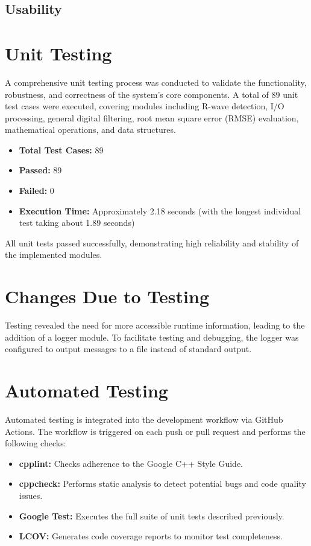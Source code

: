 \documentclass[12pt, titlepage]{article}
\begin{document}
\subsection{Usability}

\section{Unit Testing}

A comprehensive unit testing process was conducted to validate the
functionality, robustness, and correctness of the system's core components. A
total of 89 unit test cases were executed, covering modules including R-wave
detection, I/O processing, general digital filtering, root mean square error
(RMSE) evaluation, mathematical operations, and data structures.

\begin{itemize}
    \item \textbf{Total Test Cases:} 89
    \item \textbf{Passed:} 89
    \item \textbf{Failed:} 0
    \item \textbf{Execution Time:} Approximately 2.18 seconds (with the longest
    individual test taking about 1.89 seconds)
\end{itemize}

All unit tests passed successfully, demonstrating high reliability and stability
of the implemented modules.

\section{Changes Due to Testing}

Testing revealed the need for more accessible runtime information, leading to
the addition of a logger module. To facilitate testing and debugging, the logger
was configured to output messages to a file instead of standard output.

\section{Automated Testing}

Automated testing is integrated into the development workflow via GitHub
Actions. The workflow is triggered on each push or pull request and performs the
following checks:

\begin{itemize}
    \item \textbf{cpplint:} Checks adherence to the Google C++ Style Guide.
    \item \textbf{cppcheck:} Performs static analysis to detect potential bugs
    and code quality issues.
    \item \textbf{Google Test:} Executes the full suite of unit tests described
    previously.
    \item \textbf{LCOV:} Generates code coverage reports to monitor test
    completeness.
\end{itemize}
\end{document}
